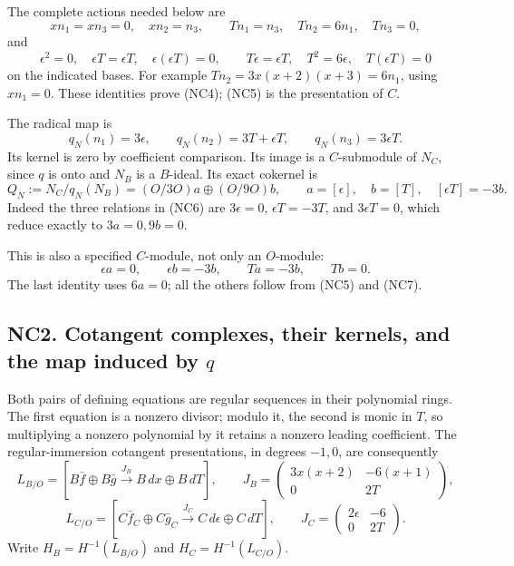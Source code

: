 \documentclass[
  10pt,
]{article}
\begin{document}
The complete actions needed below are \[
xn_1=xn_3=0,\quad xn_2=n_3,\qquad
Tn_1=n_3,\quad Tn_2=6n_1,\quad Tn_3=0,
\tag{NC4}
\] and \[
\epsilon^2=0,\quad \epsilon T=\epsilon T,\quad
\epsilon(\epsilon T)=0,\qquad
T\epsilon=\epsilon T,\quad T^2=6\epsilon,\quad T(\epsilon T)=0
\tag{NC5}
\] on the indicated bases. For example \(Tn_2=3x(x+2)(x+3)=6n_1\), using
\(xn_1=0\). These identities prove (NC4); (NC5) is the presentation of
\(C\).

The radical map is \[
q_N(n_1)=3\epsilon,\qquad
q_N(n_2)=3T+\epsilon T,\qquad
q_N(n_3)=3\epsilon T.
\tag{NC6}
\] Its kernel is zero by coefficient comparison. Its image is a
\(C\)-submodule of \(N_C\), since \(q\) is onto and \(N_B\) is a
\(B\)-ideal. Its exact cokernel is \[
Q_N:=N_C/q_N(N_B)
=(O/3O)a\oplus(O/9O)b,\qquad
a=[\epsilon],\quad b=[T],\quad[\epsilon T]=-3b.
\tag{NC7}
\] Indeed the three relations in (NC6) are \(3\epsilon=0\),
\(\epsilon T=-3T\), and \(3\epsilon T=0\), which reduce exactly to
\(3a=0,9b=0\).

This is also a specified \(C\)-module, not only an \(O\)-module: \[
\epsilon a=0,\qquad \epsilon b=-3b,\qquad
Ta=-3b,\qquad Tb=0.
\tag{NC8}
\] The last identity uses \(6a=0\); all the others follow from (NC5) and
(NC7).

\subsection{\texorpdfstring{NC2. Cotangent complexes, their kernels, and
the map induced by
\(q\)}{NC2. Cotangent complexes, their kernels, and the map induced by q}}\label{nc2.-cotangent-complexes-their-kernels-and-the-map-induced-by-q}

Both pairs of defining equations are regular sequences in their
polynomial rings. The first equation is a nonzero divisor; modulo it,
the second is monic in \(T\), so multiplying a nonzero polynomial by it
retains a nonzero leading coefficient. The regular-immersion cotangent
presentations, in degrees \(-1,0\), are consequently \[
L_{B/O}=
\left[B\bar f\oplus B\bar g
\xrightarrow{J_B}B\,dx\oplus B\,dT\right],
\qquad
J_B=
\begin{pmatrix}3x(x+2)&-6(x+1)\\0&2T\end{pmatrix},
\] \[
L_{C/O}=
\left[C\bar f_C\oplus C\bar g_C
\xrightarrow{J_C}C\,d\epsilon\oplus C\,dT\right],
\qquad
J_C=
\begin{pmatrix}2\epsilon&-6\\0&2T\end{pmatrix}.
\tag{NC9}
\] Write \(H_B=H^{-1}(L_{B/O})\) and \(H_C=H^{-1}(L_{C/O})\).
\end{document}
